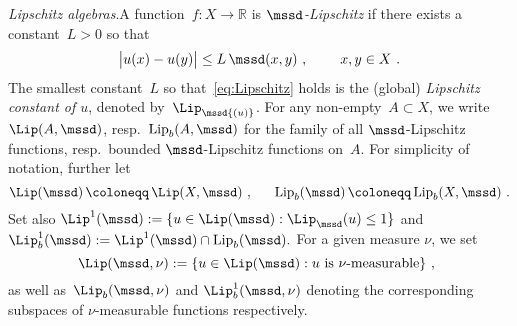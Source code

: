 \documentclass[11pt,letterpaper]{amsart}
\newcommand{\bLip}{\mathrm{Lip}_b}
\newcommand{\T}{\tau} %
\newcommand{\emparg}{{\,\cdot\,}}
\newcommand{\comm}{\,\,\mathrm{,}\;\,}
\DeclareMathOperator{\eqdef}{\coloneqq}
\newcommand{\longrar}{\longrightarrow}
\newcommand{\rar}{\rightarrow}
\newcommand{\tabs}[1]{\big\lvert#1\big\rvert}
\newcommand{\paren}[1]{\left(#1\right)}							%
\newcommand{\seq}[1]{\paren{#1}}								%
\newcommand{\N}{{\mathbb N}}
\newcommand{\R}{{\mathbb R}}
\newcommand{\comma}{\,\,\mathrm{,}\;\,}
\newcommand{\fstop}{\,\,\mathrm{.}}
\newcommand{\dUpsilon}{{\mathbf \Upsilon}}
\newcommand{\U}{\dUpsilon}
\renewcommand{\1}{\mathbf 1}
\numberwithin{equation}{section}
\theoremstyle{plain}
\theoremstyle{definition}
\theoremstyle{remark}
\renewcommand{\paragraph}[1]{\medskip\emph{#1}.\quad}
\begin{document}
%
%


\paragraph{Lipschitz algebras}A function~$f\colon X\rar \R$ is {\it $\mssd$-Lipschitz} if there exists a constant~$L>0$ so that
\begin{align}\label{eq:Lipschitz}
\tabs{ u(x)-u(y)}\leq L\, \mssd(x,y) \comm \qquad x,y\in X \fstop
\end{align}
The smallest constant~$L$ so that~\eqref{eq:Lipschitz} holds is the (global) \emph{Lipschitz constant of $u$}, denoted by~$\Lip_\mssd{(u)}$.
For any non-empty~$A\subset X$, we write~$\Lip(A,\mssd)$, resp.~$\bLip(A,\mssd)$ for the family of all $\mssd$-Lipschitz functions, resp.\ bounded $\mssd$-Lipschitz functions on~$A$. 
For simplicity of notation, further let 
$$\Lip(\mssd)\eqdef \Lip(X,\mssd)\comma\quad \ \bLip(\mssd)\eqdef \bLip(X,\mssd)\fstop$$ 
Set also $\Lip^1(\mssd):=\{u \in \Lip(\mssd): \Lip_{\mssd}(u) \le 1\}$ and $\Lip^1_b(\mssd):=\Lip^1(\mssd) \cap \bLip(\mssd).$ For a given measure $\nu$, we set 
$$\Lip(\mssd, \nu):=\{u \in \Lip(\mssd): \text{$u$ is $\nu$-measurable}\} \comma$$
as well as~$\Lip_b(\mssd, \nu)$ and $\Lip^1_b(\mssd, \nu)$ denoting the corresponding subspaces of $\nu$-measurable functions respectively.
\end{document}
